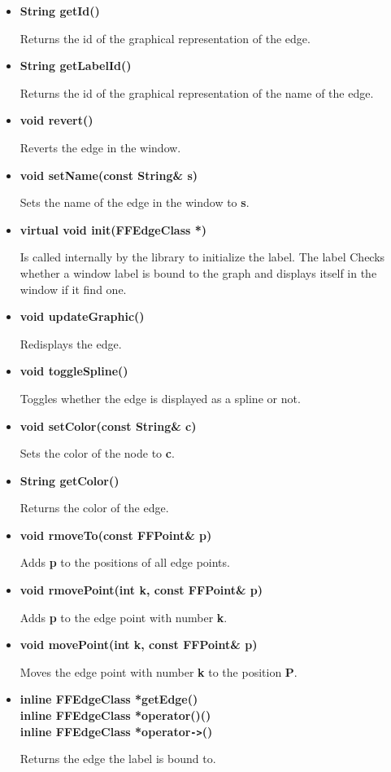 \begin{itemize}
Returns a MPlex containing all edge points.

\item{\bf String getId()}

Returns the id of the graphical representation of the edge.

\item{\bf String getLabelId()}

Returns the id of the graphical representation of the name of the
edge.

\item{\bf void revert()}

Reverts the edge in the window.

\item{\bf void setName(const String\& s)}

Sets the name of the edge in the window to {\bf s}.

\item{\bf virtual void init(FFEdgeClass *)}

Is called internally by the library to initialize the label. The label
Checks whether a window label is bound to the graph and displays
itself in the window if it find one.
        
\item{\bf void updateGraphic()}

Redisplays the edge.
  
\item{\bf void toggleSpline()}

Toggles whether the edge is displayed as a spline or not.

\item{\bf void setColor(const String\& c)}

Sets the color of the node to {\bf c}.

\item{\bf String getColor()}

Returns the color of the edge.

\item{\bf void rmoveTo(const FFPoint\& p)}

Adds {\bf p} to the positions of all edge points.

\item{\bf void rmovePoint(int k, const FFPoint\& p)}

Adds {\bf p} to the edge point with number {\bf k}.

\item{\bf void movePoint(int k, const FFPoint\& p)}

Moves the edge point with number {\bf k} to the position {\bf P}.

\item{\bf inline FFEdgeClass *getEdge()\\
 inline FFEdgeClass *operator()()\\
 inline FFEdgeClass *operator\verb|->|()}

Returns the edge the label is bound to.

\end{itemize}

